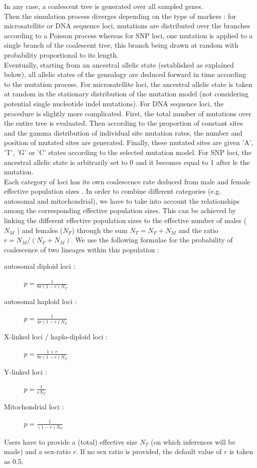 \begin{description}
 In any case, a coalescent tree is generated over all
 sampled genes.\\
Then the simulation process diverges depending on the type of markers : 
for microsatellite or DNA sequence loci, mutations are distributed over the branches according to a Poisson process whereas for SNP loci, one mutation is applied to a single branch of the coalescent tree, this branch being drawn at random with probability proportional to its length.\\
Eventually, starting from an ancestral allelic state (established as explained below), all allelic states of the
 genealogy are deduced forward in time according to the mutation
 process. For microsatellite loci, the ancestral allelic state is taken at random in the stationary distribution of the mutation model (not considering potential single nucleotide indel mutations). For DNA sequence loci, the procedure is slightly more complicated. First, the total number of mutations over the entire tree is evaluated. Then according to the proportion of constant sites and the gamma distribution of individual site mutation rates, the number and position of mutated sites are generated. Finally, these mutated sites are given 'A', 'T', 'G' or 'C' states according to the selected mutation model. For SNP loci, the ancestral allelic state is arbitrarily set to 0 and it becomes equal to 1 after le the mutation.\\
 Each category of loci has its own coalescence rate deduced from male and female effective population sizes . In order to combine different categories (e.g. autosomal and mitochondrial), we have to take into account the relationships among the corresponding effective population sizes. This can be achieved by linking the different effective population sizes to the effective number of males ( $N_M$ ) and females  ($N_F$) through the sum $N_T=N_F+N_M$ and the ratio $r = N_M/(N_F+N_M)$.  We use the following formulae for the probability of coalescence of two lineages within this population :
 \begin{description}
 \item [autosomal diploid loci :] $p=\frac{1}{8r(1-r)N_T}$
 \item [autosomal haploid loci :] $p=\frac{1}{4r(1-r)N_T}$
 \item [X-linked loci / haplo-diploid loci :] $p=\frac{1+r}{9r(1-r)N_T}$
 \item [Y-linked loci :] $p=\frac{1}{rN_T}$
 \item [Mitochondrial loci :]  $p=\frac{1}{(1-r)N_T}$
 \end{description}
Users have to provide a (total) effective size $N_T$ (on which inferences will be made) and a sex-ratio $r$.
 If no sex ratio is provided, the default value of $r$ is taken as 0.5.  
   

\end{description}
